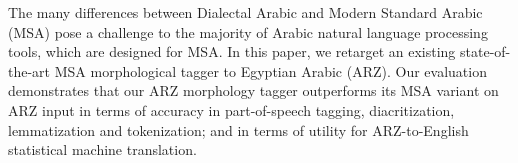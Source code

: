 The many differences between Dialectal Arabic and Modern Standard Arabic (MSA) pose a challenge to the majority of Arabic natural language processing tools,
 which are designed for MSA. In this paper, we retarget an existing
 state-of-the-art MSA morphological tagger to Egyptian Arabic (ARZ). Our
 evaluation demonstrates that our ARZ morphology tagger outperforms its MSA
 variant on ARZ input in terms of accuracy in part-of-speech tagging,
 diacritization, lemmatization and tokenization; and in terms of utility for
 ARZ-to-English statistical machine translation.

